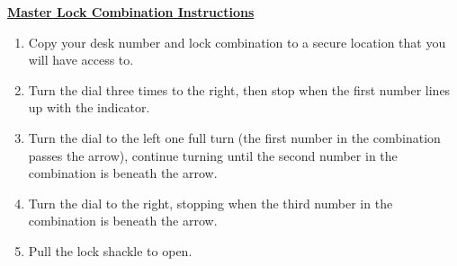 \documentclass[12pt]{article}
\begin{document}
\begin{minipage}{0.4\textwidth}
\underline{{\large \textbf{Master Lock Combination Instructions}}}
\begin{enumerate}
\item Copy your desk number and lock combination to a secure location that you will have access to.
\item Turn the dial three times to the right, then stop when the first number lines up with the indicator.
\item Turn the dial to the left one full turn (the first number in the combination passes the arrow), continue turning until the second number in the combination is beneath the arrow.
\item Turn the dial to the right, stopping when the third number in the combination is beneath the arrow.
\item Pull the lock shackle to open.
\end{enumerate}
\end{minipage}
\end{document}
